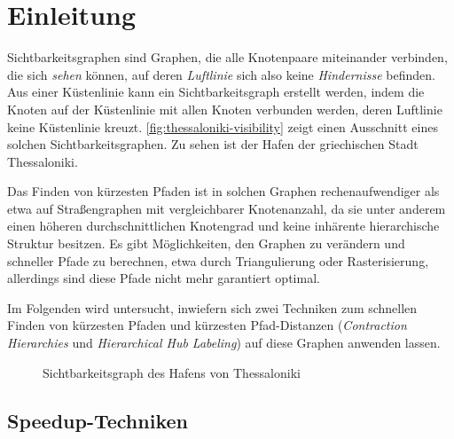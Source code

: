 \chapter{Einleitung}

Sichtbarkeitsgraphen sind Graphen, die alle Knotenpaare miteinander verbinden, die sich \emph{sehen} können, auf deren \emph{Luftlinie} sich also keine \emph{Hindernisse} befinden.
Aus einer Küstenlinie kann ein Sichtbarkeitsgraph erstellt werden, indem die Knoten auf der Küstenlinie mit allen Knoten verbunden werden, deren Luftlinie keine Küstenlinie kreuzt.
\autoref{fig:thessaloniki-visibility} zeigt einen Ausschnitt eines solchen Sichtbarkeitsgraphen.
Zu sehen ist der Hafen der griechischen Stadt Thessaloniki.

Das Finden von kürzesten Pfaden ist in solchen Graphen rechenaufwendiger als etwa auf Straßengraphen mit vergleichbarer Knotenanzahl, da sie unter anderem einen höheren durchschnittlichen Knotengrad und keine inhärente hierarchische Struktur besitzen.
Es gibt Möglichkeiten, den Graphen zu verändern und schneller Pfade zu berechnen, etwa durch Triangulierung oder Rasterisierung, allerdings sind diese Pfade nicht mehr garantiert optimal.

Im Folgenden wird untersucht, inwiefern sich zwei Techniken zum schnellen Finden von kürzesten Pfaden und kürzesten Pfad-Distanzen (\emph{Contraction Hierarchies} und \emph{Hierarchical Hub Labeling}) auf diese Graphen anwenden lassen.

\begin{figure}[ht]%
  \centering
  \caption{Sichtbarkeitsgraph des Hafens von Thessaloniki}%
  \label{fig:thessaloniki-visibility}%
\end{figure}


\section{Speedup-Techniken}

